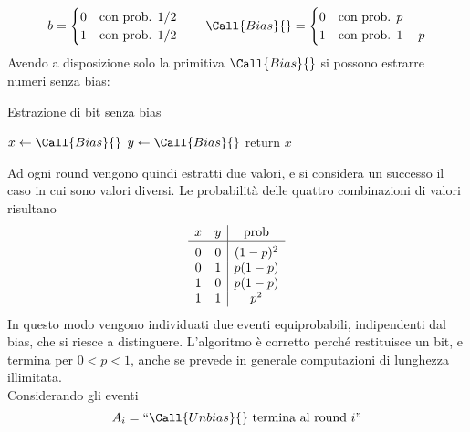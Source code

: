\begin{align*}
    b =
    \begin{cases}
        0 & 
        \text{con prob. }
        1/2
        \\
        1 & 
        \text{con prob. }
        1/2
    \end{cases}
    \qquad
    \Call{Bias}{ }
    =
    \begin{cases}
        0 & 
        \text{con prob. }
        p
        \\
        1 & 
        \text{con prob. }
        1-p
    \end{cases}
\end{align*}
Avendo a disposizione solo la primitiva $
\Call{Bias}{ }
$ si possono estrarre numeri senza bias:
\begin{algorithm}[H]
\caption{Estrazione di bit senza bias}\label{alg:unbias}
\begin{algorithmic}[1]
        \Repeat
            \State $x \gets
            \Call{Bias}{ }
            $
            \State $y \gets
            \Call{Bias}{ }
            $
        \State return $x$
    \EndProcedure
\end{algorithmic}
\end{algorithm}
\noindent
Ad ogni round vengono quindi estratti due valori, e si considera un successo il caso in cui sono valori diversi. Le probabilità delle quattro combinazioni di valori risultano
\begin{equation*}
    \begin{array}[h]{cc|c}
        x & y & \text{prob} \\
        \hline
        \rule{0pt}{1.0\normalbaselineskip}
        0 & 0 & (1-p)^2 \\
        0 & 1 & p(1-p) \\
        1 & 0 & p(1-p) \\
        1 & 1 & p^2
    \end{array}
\end{equation*}
In questo modo vengono individuati due eventi equiprobabili, indipendenti dal bias, che si riesce a distinguere.
L'algoritmo è corretto perché restituisce un bit, e termina per $0<p<1$, anche se prevede in generale computazioni di lunghezza illimitata.
\\
Considerando gli eventi
\begin{equation*}
    A_i = \text{``$
    \Call{Unbias}{ }
    $ termina al round $i$''}
\end{equation*}
